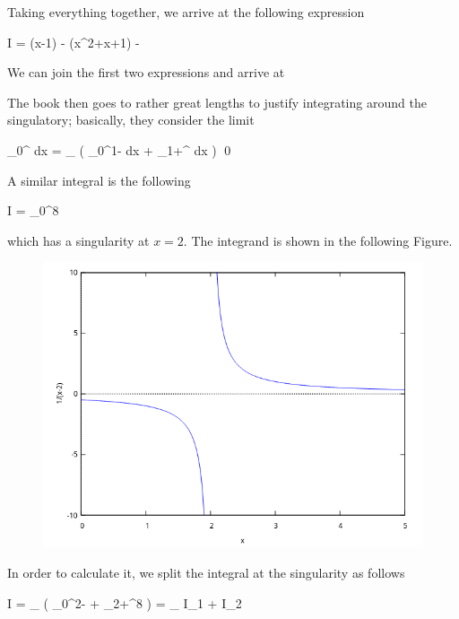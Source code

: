 Taking everything together, we arrive at the following expression

\bee
I =  \ln (x-1) -  \ln (x^2+x+1) -  \arctan {}
\eee

We can join the first two expressions and arrive at

\bee
{}
\eee

The book then goes to rather great lengths to justify integrating around the singulatory; basically, they consider the limit

\bee
\int_0^\infty {} dx = \lim_{\epsilon {}} \left( \int_0^{1-\epsilon}  dx + \int_{1+\epsilon}^\infty {} dx \right) \qed
\eee

A similar integral is the following

\bee
I = \int_0^8 
\eee

which has a singularity at $x = 2$. The integrand is shown in the following Figure.


\begin{figure}[H]
\includegraphics[scale=0.7]{images/2016-02-15_10.png}
\end{figure}

In order to calculate it, we split the integral at the singularity as follows

\bee
I = \lim_{\epsilon {}} \left( \int_0^{2-\epsilon}  + \int_{2+\epsilon}^8  \right) = \lim_{\epsilon {}} I_1 + I_2
\eee

